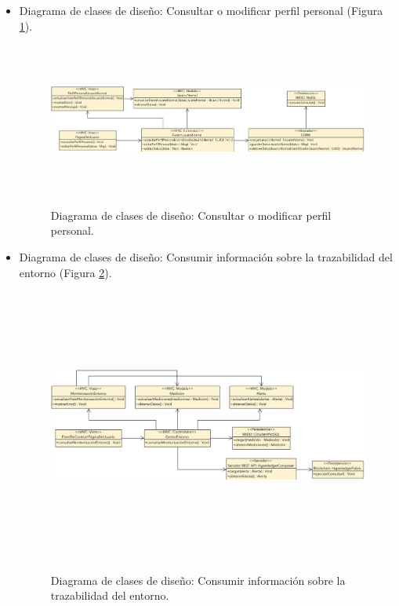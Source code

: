 \documentclass[12pt,a4paper, twoside]{report}
\begin{document}
\begin{itemize}
		\item Diagrama de clases de diseño: Consultar o modificar perfil personal (Figura \ref{fig:classes_perfil}).
		
		\begin{figure}[!ht]   
			\caption{Diagrama de clases de diseño: Consultar o modificar perfil personal.} 
			\begin{center} 
	 			\includegraphics[width=17cm,height=5cm]{Images/design/classes/classes_perfilPersonal} \\
				\label{fig:classes_perfil} 
			\end{center}
		\end{figure} 
		
		\newpage
		
		\item Diagrama de clases de diseño: Consumir información sobre la trazabilidad del entorno (Figura \ref{fig:classes_consumirInfo}).
		
		\begin{figure}[!ht]   
			\caption{Diagrama de clases de diseño: Consumir información sobre la trazabilidad del entorno.} 
			\begin{center} 
	 			\includegraphics[width=17cm,height=9cm]{Images/design/classes/classes_consumirInfo} \\
				\label{fig:classes_consumirInfo} 
			\end{center}  
		\end{figure} 
		
	\end{itemize}
		
\end{document}
